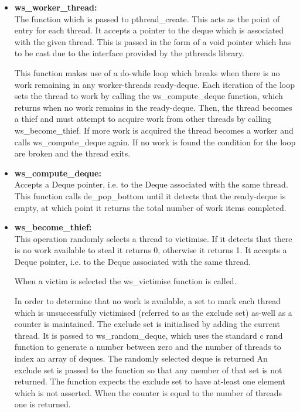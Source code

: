 \begin{itemize}
\item \textbf{ws\_worker\_thread: } \\
                The function which is passed to pthread\_create. This acts as the point of entry for each \gls{thread}.
                It accepts a pointer to the deque which is associated with the given thread. This is passed 
                in the form of a void pointer which has to be cast due to the interface provided by the pthreads
                library.
              
                This function makes use of a do-while loop which breaks when there is no work remaining in any \glspl{worker-thread} \gls{ready-deque}. 
                Each iteration of the loop sets the thread to work by calling the ws\_compute\_deque function, which returns when 
                no work remains in the \gls{ready-deque}. Then, the thread becomes a \gls{thief} and must attempt to acquire work
                from other threads by calling ws\_become\_thief. If more work is acquired the thread becomes a worker and calls ws\_compute\_deque
                again. If no work is found the condition for the loop are broken and the thread exits.
              
\item \textbf{ws\_compute\_deque: } \\
                Accepts a Deque pointer, i.e. to the Deque associated with the same thread. This function 
                calls de\_pop\_bottom until it detects that the ready-deque is empty, at which point it returns
                the total number of work items completed.
                
\item \textbf{ws\_become\_thief: } \\
                This operation randomly selects a thread to victimise. If it detects that there is no work
                available to steal it returns 0, otherwise it returns 1.
                It accepts a Deque pointer, i.e. to the Deque associated with the same thread. 
                
                When a victim is selected the ws\_victimise function is called.
                
                In order to determine that no work is available, a set to mark each thread which is unsuccessfully victimised (referred to as
                the exclude set) as-well as a counter is maintained.
                The exclude set is initialised by adding the current thread. It is passed to ws\_random\_deque, which
                uses the standard c rand function to generate a number between zero and the number of threads to index an array 
                of deques. The randomly selected deque is returned An exclude set is passed to the function so that any member 
                of that set is not returned.
                The function expects the exclude set to have at-least one element which is not asserted.
                When the counter is equal to the number of threads one is returned.
                

\end{itemize}
